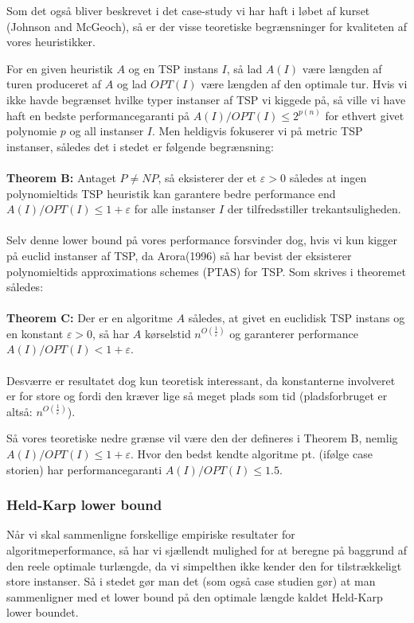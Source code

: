 Som det også bliver beskrevet i det case-study vi har haft i løbet af kurset (Johnson and McGeoch), så er der visse teoretiske begrænsninger for kvaliteten af vores heuristikker.

For en given heuristik $A$ og en TSP instans $I$, så lad $A(I)$ være længden af turen produceret af $A$ og lad $OPT(I)$ være længden af den optimale tur. Hvis vi ikke havde begrænset hvilke typer instanser af TSP vi kiggede på, så ville vi have haft en bedste performancegaranti på $A(I)/OPT(I) \leq 2^{p(n)}$ for ethvert givet polynomie $p$ og all instanser $I$. Men heldigvis fokuserer vi på metric TSP instanser, således det i stedet er følgende begrænsning:\\
~\\
\textbf{Theorem B:} Antaget $P \neq NP$, så eksisterer der et $\varepsilon > 0$ således at ingen polynomieltids TSP heuristik kan garantere bedre performance end $A(I)/OPT(I) \leq 1+\varepsilon$ for alle instanser $I$ der tilfredsstiller trekantsuligheden.\\
~\\
Selv denne lower bound på vores performance forsvinder dog, hvis vi kun kigger på euclid instanser af TSP, da Arora(1996) så har bevist der eksisterer polynomieltids approximations schemes (PTAS) for TSP. Som skrives i theoremet således:\\
~\\
\textbf{Theorem C:} Der er en algoritme $A$ således, at givet en euclidisk TSP instans og en konstant $\varepsilon > 0$, så har $A$ kørselstid $n^{O(\frac{1}{\varepsilon})}$ og garanterer performance $A(I)/OPT(I) < 1+\varepsilon$.\\
~\\
Desværre er resultatet dog kun teoretisk interessant, da konstanterne involveret er for store og fordi den kræver lige så meget plads som tid (pladsforbruget er altså: $n^{O(\frac{1}{\varepsilon})}$). 

Så vores teoretiske nedre grænse vil være den der defineres i Theorem B, nemlig $A(I)/OPT(I) \leq 1+\varepsilon$. Hvor den bedst kendte algoritme pt. (ifølge case storien) har performancegaranti $A(I)/OPT(I) \leq 1.5$.

\subsubsection{Held-Karp lower bound}

Når vi skal sammenligne forskellige empiriske resultater for algoritmeperformance, så har vi sjællendt mulighed for at beregne på baggrund af den reele optimale turlængde, da vi simpelthen ikke kender den for tilstrækkeligt store instanser. Så i stedet gør man det (som også case studien gør) at man sammenligner med et lower bound på den optimale længde kaldet Held-Karp lower boundet.

